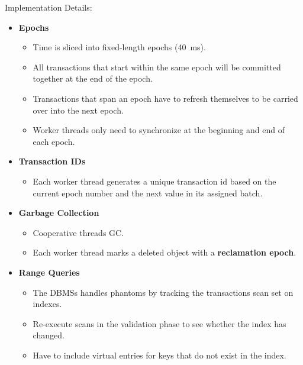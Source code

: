 \documentclass[11pt]{article}
\begin{document}
Implementation Details:
\begin{itemize}
    \item \textbf{Epochs}
    \begin{itemize}
        \item
        Time is sliced into fixed-length epochs (40~ms).
        
        \item
        All transactions that start within the same epoch will be committed together at the end of 
        the epoch.
        
        \item
        Transactions that span an epoch have to refresh themselves to be carried over into the next 
        epoch.
        
        \item
        Worker threads only need to synchronize at the beginning and end of each epoch.
    \end{itemize}
    
    \item \textbf{Transaction IDs}
    \begin{itemize}
        \item
        Each worker thread generates a unique transaction id based on the current epoch number and 
        the next value in its assigned batch.
    \end{itemize}
    
    \item \textbf{Garbage Collection}
    \begin{itemize}
        \item
        Cooperative threads GC.
        
        \item
        Each worker thread marks a deleted object with a \textbf{reclamation epoch}.
    \end{itemize}
    
    \item \textbf{Range Queries}
    \begin{itemize}
        \item
        The DBMSs handles phantoms by tracking the transactions scan set on indexes.
        
        \item
        Re-execute scans in the validation phase to see whether the index has changed.
        
        \item
        Have to include virtual entries for keys that do not exist in the index.
    \end{itemize}
\end{itemize}

\newpage


\end{document}
